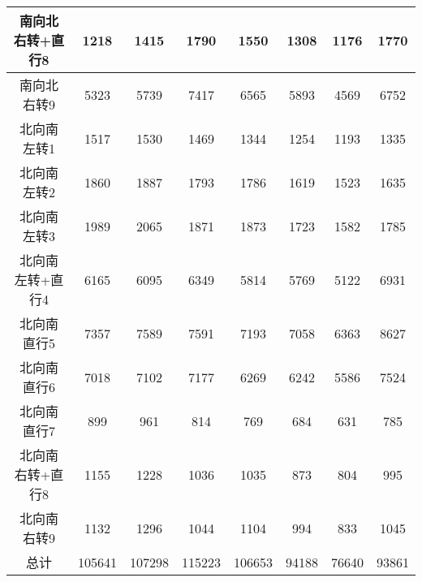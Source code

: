 \documentclass[UTF8]{article}
\begin{document}
\begin{table}[h]
\begin{tabular}{cccccccc}
            \hline
            南向北右转+直行8	&1218	&1415	&1790	&1550	&1308	&1176	&1770\\
            \hline            
            南向北右转9	&5323	&5739	&7417	&6565	&5893	&4569	&6752\\
            \hline
            北向南左转1	&1517	&1530	&1469	&1344	&1254	&1193	&1335\\
            \hline
            北向南左转2	&1860	&1887	&1793	&1786	&1619	&1523	&1635\\
            \hline
            北向南左转3	&1989	&2065	&1871	&1873	&1723	&1582	&1785\\
            \hline
            北向南左转+直行4	&6165	&6095	&6349	&5814	&5769	&5122	&6931\\
            \hline
            北向南直行5	&7357	&7589	&7591	&7193	&7058	&6363	&8627\\
            \hline
            北向南直行6	&7018	&7102	&7177	&6269	&6242	&5586	&7524\\
            \hline
            北向南直行7	&899	&961	&814	&769	&684	&631	&785\\
            \hline
            北向南右转+直行8	&1155	&1228	&1036	&1035	&873	&804	&995\\
            \hline
            北向南右转9	&1132	&1296	&1044	&1104	&994	&833	&1045\\
            \hline
            总计	&105641	&107298	&115223	&106653	&94188	&76640	&93861\\
            \hline
            
        \end{tabular}
    \end{table}

    
\end{document}
